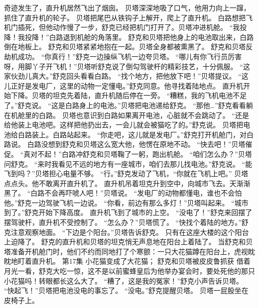 \documentclass[a4paper,12pt,UTF8,twoside]{ctexbook}
\begin{document}
        奇迹发生了，直升机居然飞出了烟囱。 
        贝塔深深地吸了口气，他用力向上一蹿，抓住了直升机的轮子。 
        贝塔把尾巴从铁钩子上解开，爬上了直升机。 
        白路想把飞机门插死，但他动作慢了一步，舒克已经把机门打开了。贝塔冲进机舱。 
        “我投降！我投降！”白路退到机舱的角落里。 
        舒克和贝塔把他身上的电池取出来，白路倒在地板上。 
        舒克和贝塔紧紧地抱在一起。贝塔全身都被熏黑了。 
        舒克和贝塔反劫机成功。 
        “你真行！”舒克一边操纵飞机一边夸贝塔。 
        “哪儿有你飞行员厉害呀，用脚丫子开飞机！”贝塔听舒克说了倒勾驾驶杆的精彩技艺，十分佩服。 
        “这家伙劲儿真大。”舒克回头看看白路。 
        “找个地方，把他放下吧！”贝塔提议。 
        “这儿正好是发电厂，这里的动物一定懂电。”舒克同意。他寻找着陆地点。 
        直升机开始下降。贝塔的坦克先着陆，直升机随后停在一旁。 
        “糟糕，我的飞机电池不足了。”舒克说。 
        “这是白路身上的电池。”贝塔把电池递给舒克。 
        “那他…”舒克看看躺在机舱里的白路。 
        贝塔也意识到白路如果离开电池，心脏就不会跳动了。 
        “还是给他装上电池吧。这样把他扔出去，一会儿就会被猫吃了的。”舒克说。 
        贝塔把电池给白路装上。白路站起来。 
        “你走吧，这儿就是发电厂。”舒克打开机舱门，对白路说。 
        白路没想到舒克和贝塔这么宽大他，他愣在原地不动。 
        “快去吧！”贝塔催促。 
        “真对不起！”白路冲舒克和贝塔鞠了一躬，跑出机舱。 
        “咱们怎么办？”贝塔问舒克。 
        “来时我看见不远的地方有一座城市，咱们去那儿找电池。”舒克说。 
        “能飞到吗？”贝塔担心电量不够。 
        “行。”舒克发动了飞机，“你就在飞机上吧。” 
        贝塔点点头。他不敢离开直升机了。 
        直升机吊着坦克升到空中，向城市飞去。天渐渐黑了。 
        “白路不会再吓唬人吧！”贝塔说。 
        “发电厂的动物都懂电，谁也不会怕他。”舒克一边驾驶飞机一边说。 
        “你看，前边有那么多灯！”贝塔叫起来。 
        “城市到了。”舒克开始下降高度。 
        直升机飞到了城市的上空。 
        “没电了！”舒克来回摆了摆驾驶杆，直升机不受控制了。 
        “怎么办？”贝塔慌了。 
        “快找个着陆的地方。”舒克注意观察地面。 
        “下边是个阳台。”贝塔告诉舒克。 
        只有在这座大楼的这个阳台上迫降了。 
        舒克的直升机和贝塔的坦克悄无声息地在阳台上着陆了。 
        当舒克和贝塔准备开机舱门时，他们不约而同地打了个寒颤：一只大花猫蹲在阳台上，虎视眈眈地盯着直升机。   第17集   
        小花猫变成了大花猫； 
        舒克和贝塔被皮皮鲁抓获   
        借着月光一看，舒克大吃一惊，这不是以前蜜蜂皇后为他举办宴会时，要处死他的那只小花猫吗！转眼都长这么大了。 
        “糟了，这是我的冤家！”舒克小声告诉贝塔。 
        “快起飞！”贝塔把电池没电的事忘了。 
        “没电。”舒克提醒贝塔。 
        贝塔一屁股坐在皮椅子上。 
\end{document}
